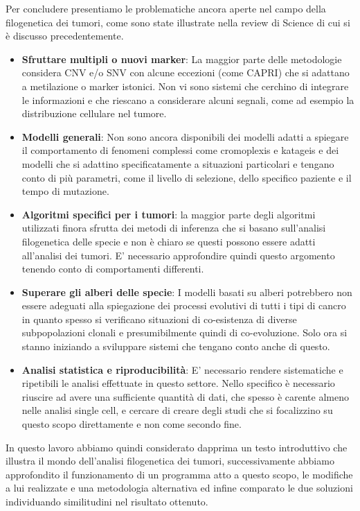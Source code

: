 \documentclass[a4paper]{article}
\begin{document}
	Per concludere presentiamo le problematiche ancora aperte nel campo della filogenetica dei tumori, come sono state illustrate nella review di Science di cui si
	è discusso precedentemente. 

	\begin{itemize}
	\item \textbf{Sfruttare multipli o nuovi marker}: La maggior parte delle metodologie considera CNV e/o SNV con alcune eccezioni (come CAPRI) che si 
	adattano a metilazione o marker istonici. Non vi sono sistemi che cerchino di integrare le informazioni e che riescano a considerare alcuni 
	segnali, come ad esempio la distribuzione cellulare nel tumore.	
	\item \textbf{Modelli generali}: Non sono ancora disponibili dei modelli adatti a spiegare il comportamento di fenomeni complessi come cromoplexis e katageis
	e dei modelli che si adattino specificatamente a situazioni particolari e tengano conto di più parametri, come il livello di selezione, dello specifico paziente e
	il tempo di mutazione.
	\item \textbf{Algoritmi specifici per i tumori}: la maggior parte degli algoritmi utilizzati finora sfrutta dei metodi di inferenza che si basano sull'analisi
	filogenetica delle specie e non è chiaro se questi possono essere adatti all'analisi dei tumori. E' necessario approfondire quindi questo argomento 
	tenendo conto di comportamenti differenti.  
	\item \textbf{Superare gli alberi delle specie}: I modelli basati su alberi potrebbero non essere adeguati alla spiegazione dei processi evolutivi di 
	tutti i tipi di cancro in quanto spesso si verificano situazioni di co-esistenza di diverse subpopolazioni clonali e presumibilmente quindi di co-evoluzione.
	Solo ora si stanno iniziando a sviluppare sistemi che tengano conto anche di questo.
	\item \textbf{Analisi statistica e riproducibilità}: E' necessario rendere sistematiche e ripetibili le analisi effettuate in questo settore. 
	Nello specifico è necessario riuscire ad avere una sufficiente quantità di dati, che spesso è carente almeno nelle analisi single cell, e 
	cercare di creare degli studi che si focalizzino su questo scopo direttamente e non come secondo fine. 
	\end{itemize}
		
	In questo lavoro abbiamo quindi considerato dapprima un testo introduttivo che illustra il mondo dell'analisi filogenetica dei tumori, successivamente 
	abbiamo approfondito il funzionamento di
	un programma atto a questo scopo, le modifiche a lui realizzate e una metodologia alternativa ed infine comparato le due soluzioni 
	individuando similitudini nel risultato ottenuto. 
\end{document}
